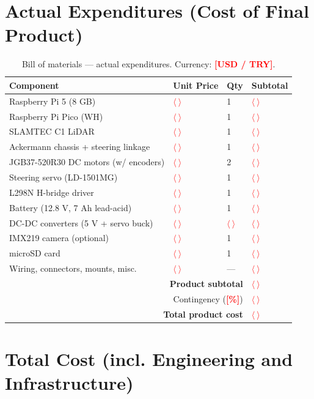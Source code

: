 \documentclass[12pt,a4paper]{report}
\newcommand{\TODO}[1]{\textcolor{red}{\textbf{[#1]}}}
\newcommand{\fillin}{\textcolor{red}{$\langle\ \rangle$}}
\begin{document}
\section{Actual Expenditures (Cost of Final Product)}

\begin{table}[H]
\centering
\caption{Bill of materials --- actual expenditures. Currency: \TODO{USD / TRY}.}
\label{tab:bom}
\begin{tabularx}{\textwidth}{|X|p{2.2cm}|p{1.4cm}|p{2.4cm}|}
\hline
\textbf{Component} & \textbf{Unit Price} & \textbf{Qty} & \textbf{Subtotal} \\
\hline
Raspberry Pi 5 (8 GB) & \fillin & 1 & \fillin \\
\hline
Raspberry Pi Pico (WH) & \fillin & 1 & \fillin \\
\hline
SLAMTEC C1 LiDAR & \fillin & 1 & \fillin \\
\hline
Ackermann chassis + steering linkage & \fillin & 1 & \fillin \\
\hline
JGB37-520R30 DC motors (w/ encoders) & \fillin & 2 & \fillin \\
\hline
Steering servo (LD-1501MG) & \fillin & 1 & \fillin \\
\hline
L298N H-bridge driver & \fillin & 1 & \fillin \\
\hline
Battery (12.8 V, 7 Ah lead-acid) & \fillin & 1 & \fillin \\
\hline
DC-DC converters (5 V + servo buck) & \fillin & \fillin & \fillin \\
\hline
IMX219 camera (optional) & \fillin & 1 & \fillin \\
\hline
microSD card & \fillin & 1 & \fillin \\
\hline
Wiring, connectors, mounts, misc. & \fillin & --- & \fillin \\
\hline
\multicolumn{3}{|r|}{\textbf{Product subtotal}} & \fillin \\
\hline
\multicolumn{3}{|r|}{Contingency (\TODO{\%})} & \fillin \\
\hline
\multicolumn{3}{|r|}{\textbf{Total product cost}} & \fillin \\
\hline
\end{tabularx}
\end{table}

\section{Total Cost (incl. Engineering and Infrastructure)}
\end{document}
